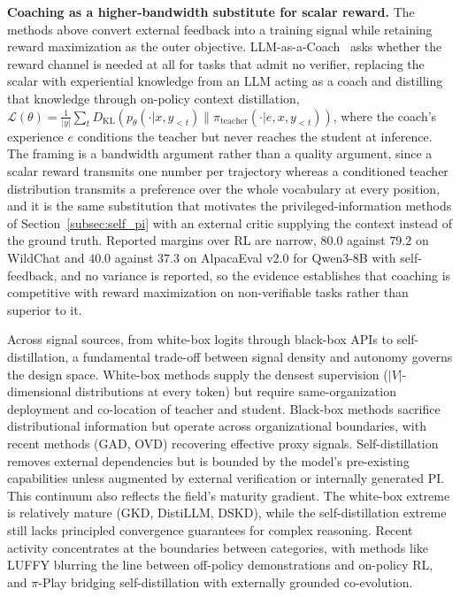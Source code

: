 \documentclass{article} %
\newcommand{\KL}{D_{\mathrm{KL}}}
\newcommand{\ptheta}{p_\theta}
\newcommand{\loss}{\mathcal{L}}
\begin{document}
\textbf{Coaching as a higher-bandwidth substitute for scalar reward.} The methods above convert external feedback into a training signal while retaining reward maximization as the outer objective. LLM-as-a-Coach~\citep{2607.18110} asks whether the reward channel is needed at all for tasks that admit no verifier, replacing the scalar with experiential knowledge from an LLM acting as a coach and distilling that knowledge through on-policy context distillation, $\loss(\theta) = \frac{1}{|y|}\sum_t \KL(\ptheta(\cdot|x,y_{<t}) \parallel \pi_{\mathrm{teacher}}(\cdot|e,x,y_{<t}))$, where the coach's experience $e$ conditions the teacher but never reaches the student at inference. The framing is a bandwidth argument rather than a quality argument, since a scalar reward transmits one number per trajectory whereas a conditioned teacher distribution transmits a preference over the whole vocabulary at every position, and it is the same substitution that motivates the privileged-information methods of Section~\ref{subsec:self_pi} with an external critic supplying the context instead of the ground truth. Reported margins over RL are narrow, $80.0$ against $79.2$ on WildChat and $40.0$ against $37.3$ on AlpacaEval v2.0 for Qwen3-8B with self-feedback, and no variance is reported, so the evidence establishes that coaching is competitive with reward maximization on non-verifiable tasks rather than superior to it.

Across signal sources, from white-box logits through black-box APIs to self-distillation, a fundamental trade-off between signal density and autonomy governs the design space. White-box methods supply the densest supervision ($|V|$-dimensional distributions at every token) but require same-organization deployment and co-location of teacher and student. Black-box methods sacrifice distributional information but operate across organizational boundaries, with recent methods (GAD, OVD) recovering effective proxy signals. Self-distillation removes external dependencies but is bounded by the model's pre-existing capabilities unless augmented by external verification or internally generated PI. This continuum also reflects the field's maturity gradient. The white-box extreme is relatively mature (GKD, DistiLLM, DSKD), while the self-distillation extreme still lacks principled convergence guarantees for complex reasoning. Recent activity concentrates at the boundaries between categories, with methods like LUFFY blurring the line between off-policy demonstrations and on-policy RL, and $\pi$-Play bridging self-distillation with externally grounded co-evolution.
\end{document}
